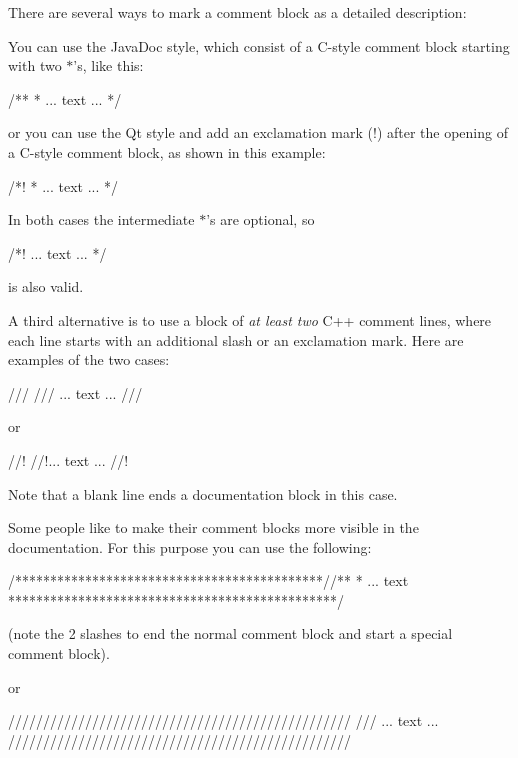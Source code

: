 There are several ways to mark a comment block as a detailed description: 
\begin{DoxyEnumerate}
\item You can use the JavaDoc style, which consist of a C-\/style comment block starting with two $\ast$'s, like this:

\begin{DoxyVerb}
/**
 * ... text ...
 */
\end{DoxyVerb}



\item or you can use the Qt style and add an exclamation mark (!) after the opening of a C-\/style comment block, as shown in this example:

\begin{DoxyVerb}
/*!
 * ... text ...
 */
\end{DoxyVerb}


In both cases the intermediate $\ast$'s are optional, so

\begin{DoxyVerb}
/*!
 ... text ...
*/
\end{DoxyVerb}


is also valid.


\item A third alternative is to use a block of {\itshape at least two\/} C++ comment lines, where each line starts with an additional slash or an exclamation mark. Here are examples of the two cases:

\begin{DoxyVerb}
///
/// ... text ...
///
\end{DoxyVerb}


or

\begin{DoxyVerb}
//!
//!... text ...
//!
\end{DoxyVerb}


Note that a blank line ends a documentation block in this case.


\item 

Some people like to make their comment blocks more visible in the documentation. For this purpose you can use the following:

\begin{DoxyVerb}
/********************************************//**
 *  ... text
 ***********************************************/
\end{DoxyVerb}
 (note the 2 slashes to end the normal comment block and start a special comment block).

or

\begin{DoxyVerb}
/////////////////////////////////////////////////
/// ... text ...
/////////////////////////////////////////////////
\end{DoxyVerb}



\end{DoxyEnumerate}

